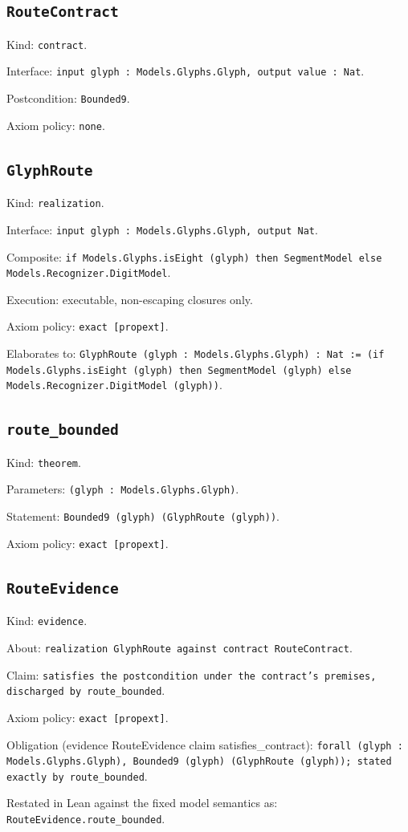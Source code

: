 \documentclass[11pt]{article}
\begin{document}
\subsection*{\texttt{RouteContract}}
\noindent Kind: \texttt{contract}.\par
\noindent Interface: \texttt{input glyph : Models.Glyphs.Glyph, output value : Nat}.\par
\noindent Postcondition: \texttt{Bounded9}.\par
\noindent Axiom policy: \texttt{none}.\par
\subsection*{\texttt{GlyphRoute}}
\noindent Kind: \texttt{realization}.\par
\noindent Interface: \texttt{input glyph : Models.Glyphs.Glyph, output Nat}.\par
\noindent Composite: \texttt{if Models.Glyphs.isEight (glyph) then SegmentModel else Models.Recognizer.DigitModel}.\par
\noindent Execution: executable, non-escaping closures only.\par
\noindent Axiom policy: \texttt{exact [propext]}.\par
\noindent Elaborates to: \texttt{GlyphRoute (glyph : Models.Glyphs.Glyph) : Nat := (if Models.Glyphs.isEight (glyph) then SegmentModel (glyph) else Models.Recognizer.DigitModel (glyph))}.\par
\subsection*{\texttt{route\_bounded}}
\noindent Kind: \texttt{theorem}.\par
\noindent Parameters: \texttt{(glyph : Models.Glyphs.Glyph)}.\par
\noindent Statement: \texttt{Bounded9 (glyph) (GlyphRoute (glyph))}.\par
\noindent Axiom policy: \texttt{exact [propext]}.\par
\subsection*{\texttt{RouteEvidence}}
\noindent Kind: \texttt{evidence}.\par
\noindent About: \texttt{realization GlyphRoute against contract RouteContract}.\par
\noindent Claim: \texttt{satisfies the postcondition under the contract's premises, discharged by route\_bounded}.\par
\noindent Axiom policy: \texttt{exact [propext]}.\par
\noindent Obligation (evidence RouteEvidence claim satisfies\_contract): \texttt{forall (glyph : Models.Glyphs.Glyph), Bounded9 (glyph) (GlyphRoute (glyph)); stated exactly by route\_bounded}.\par
\noindent Restated in Lean against the fixed model semantics as: \texttt{RouteEvidence.route\_bounded}.\par
\end{document}

